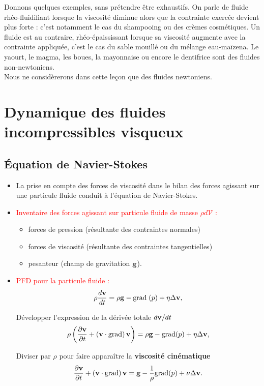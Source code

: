\documentclass[11pt,a4paper]{report}
\begin{document}
Donnons quelques exemples, sans prétendre être exhaustifs. On parle de fluide rhéo-fluidifiant lorsque la viscosité diminue alors que la contrainte exercée devient plus forte : c'est notamment le cas du shampooing ou des crèmes cosmétiques. Un fluide est au contraire, rhéo-épaississant lorsque sa viscosité augmente avec la contrainte appliquée, c'est le cas du sable mouillé ou du mélange eau-maïzena. Le yaourt, le magma, les boues, la mayonnaise ou encore le dentifrice sont des fluides non-newtoniens.\\

Nous ne considèrerons dans cette leçon que des fluides newtoniens.

\newpage
\section{Dynamique des fluides incompressibles visqueux}\label{sec:2}

\subsection{Équation de Navier-Stokes}\label{sec:2.1}

\begin{itemize}
	\item La prise en compte des forces de viscosité dans le bilan des forces agissant sur une particule fluide conduit à l'équation de Navier-Stokes.\\
	
	\item \textcolor{red}{Inventaire des forces agissant sur particule fluide de masse $\rho d\mathcal{V}$ :}
	\begin{itemize}
		\item forces de pression (résultante des contraintes normales)
		\item forces de viscosité (résultante des contraintes tangentielles)
		\item pesanteur (champ de gravitation $\bold{g}$). 
	\end{itemize}
	
	\item \textcolor{red}{PFD pour la particule fluide :}
	\begin{equation}
		\rho\frac{d\bold{v}}{dt} = \rho\bold{g} - \bold{\text{grad}}\;(p) + \eta\Delta\bold{v},
	\end{equation}
	
	Développer l'expression de la dérivée totale $d\bold{v}/dt$
	\begin{equation}
		\rho\left(\frac{\partial\bold{v}}{\partial t}+\left(\bold{v}\cdot\bold{\text{grad}}\right)\bold{v}\right)=\rho\bold{g}-\bold{\text{grad}}(p)+\eta\Delta\bold{v},
	\end{equation}	
	
	Diviser par $\rho$ pour faire apparaître la \textbf{viscosité cinématique}
	\begin{equation}
		\frac{\partial\bold{v}}{\partial t} + \left(\bold{v}\cdot\bold{\text{grad}}\right)\bold{v} = \bold{g} - \frac{1}{\rho}\bold{\text{grad}}(p) + \nu\Delta\bold{v}.
	\end{equation}
\end{itemize}
\end{document}
